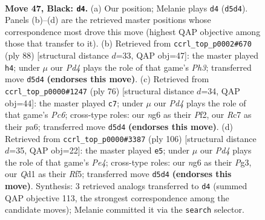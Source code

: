\documentclass[11pt]{article}
\begin{document}
\clearpage

\begin{figure}[p]\centering
\begin{subfigure}{0.46\textwidth}\centering
\resizebox{\linewidth}{!}{%
\newchessgame
\chessboard[
  setfen={6k1/2r3p1/1p4N1/r2p4/P3p3/R7/5PK1/3q4 b - - 3 47},
  showmover=false,
  pgfstyle=straightmove, color=movearrow, markmove={d5-d4}
]}
\caption{}
\end{subfigure}\hfill
\begin{subfigure}{0.46\textwidth}\centering
\resizebox{\linewidth}{!}{%
\newchessgame
\chessboard[
  setfen={8/5pk1/4p3/1r4pR/6P1/7P/5PK1/8 w - - 0 45},
  showmover=false,
  pgfstyle=straightmove, color=movearrow, markmove={h3-h4}
]}
\caption{}
\end{subfigure}
\\[4pt]
\begin{subfigure}{0.46\textwidth}\centering
\resizebox{\linewidth}{!}{%
\newchessgame
\chessboard[
  setfen={8/5pk1/p1PR4/P2p2p1/3r4/6KP/5P2/8 w - - 0 39},
  showmover=false,
  pgfstyle=straightmove, color=movearrow, markmove={c6-c7}
]}
\caption{}
\end{subfigure}\hfill
\begin{subfigure}{0.46\textwidth}\centering
\resizebox{\linewidth}{!}{%
\newchessgame
\chessboard[
  setfen={1r6/2r3k1/3p3p/p2P1R2/2p1PP2/6P1/2R2K2/8 w - - 0 54},
  showmover=false,
  pgfstyle=straightmove, color=movearrow, markmove={e4-e5}
]}
\caption{}
\end{subfigure}
\caption{\textbf{Move 47, Black: \texttt{d4}.} (a) Our position; Melanie plays \texttt{d4} (\texttt{d5d4}). Panels (b)--(d) are the retrieved master positions whose correspondence most drove this move (highest QAP objective among those that transfer to it). (b) Retrieved from \texttt{ccrl\_top\_p0002\#670} (ply 88) [structural distance $d$=33, QAP obj=47]: the master played \texttt{h4}; under $\mu$ our \emph{Pd4} plays the role of that game's \emph{Ph3}; transferred move \texttt{d5d4} \textbf{(endorses this move)}. (c) Retrieved from \texttt{ccrl\_top\_p0000\#1247} (ply 76) [structural distance $d$=34, QAP obj=44]: the master played \texttt{c7}; under $\mu$ our \emph{Pd4} plays the role of that game's \emph{Pc6}; cross-type roles: our \emph{n}g6 as their \emph{P}f2, our \emph{R}c7 as their \emph{p}a6; transferred move \texttt{d5d4} \textbf{(endorses this move)}. (d) Retrieved from \texttt{ccrl\_top\_p0000\#3387} (ply 106) [structural distance $d$=35, QAP obj=22]: the master played \texttt{e5}; under $\mu$ our \emph{Pd4} plays the role of that game's \emph{Pe4}; cross-type roles: our \emph{n}g6 as their \emph{P}g3, our \emph{Q}d1 as their \emph{R}f5; transferred move \texttt{d5d4} \textbf{(endorses this move)}. Synthesis: 3 retrieved analogs transferred to \texttt{d4} (summed QAP objective 113, the strongest correspondence among the candidate moves); Melanie committed it via the \texttt{search} selector.}
\label{fig:thought-m93}
\end{figure}
\end{document}
